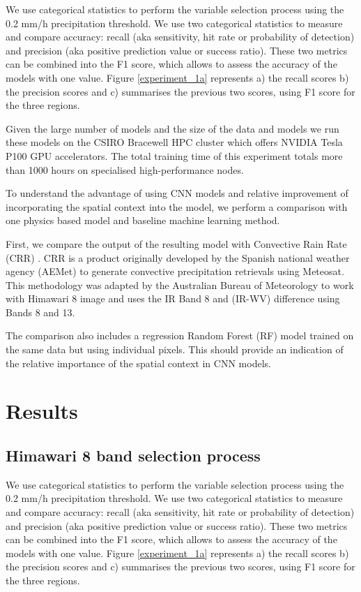 \documentclass[3p,times]{elsarticle}
\begin{document}
We use categorical statistics to perform the variable selection process using the 0.2 mm/h precipitation threshold. We use two categorical statistics to measure and compare accuracy: recall (aka sensitivity, hit rate or probability of detection) and precision (aka positive prediction value or success ratio). These two metrics can be combined into the F1 score, which allows to assess the accuracy of the models with one value. Figure \ref{experiment_1a} represents a) the recall scores b) the precision scores and c) summarises the previous two scores, using F1 score for the three regions.

Given the large number of models and the size of the data and models we run these models on the CSIRO Bracewell HPC cluster which offers NVIDIA Tesla P100 GPU accelerators. The total training time of this experiment totals more than 1000 hours on specialised high-performance nodes.

To understand the advantage of using CNN models and relative improvement of incorporating the spatial context into the model, we perform a comparison with one physics based model and baseline machine learning method.

First, we compare the output of the resulting model with Convective Rain Rate (CRR) \citep{aemetsaf2013}. CRR is a product originally developed by the Spanish national weather agency (AEMet) to generate convective precipitation retrievals using Meteosat. This methodology was adapted by the Australian Bureau of Meteorology to work with Himawari 8 image and uses the IR Band 8 and (IR-WV) difference using Bands 8 and 13.

The comparison also includes a regression Random Forest (RF) model \citep{breiman2001random} trained on the same data but using individual pixels. This should provide an indication of the relative importance of the spatial context in CNN models.


\section{Results}

\subsection{Himawari 8 band selection process}

We use categorical statistics to perform the variable selection process using the 0.2 mm/h precipitation threshold. We use two categorical statistics to measure and compare accuracy: recall (aka sensitivity, hit rate or probability of detection) and precision (aka positive prediction value or success ratio). These two metrics can be combined into the F1 score, which allows to assess the accuracy of the models with one value. Figure \ref{experiment_1a} represents a) the recall scores b) the precision scores and c) summarises the previous two scores, using F1 score for the three regions.
\end{document}
